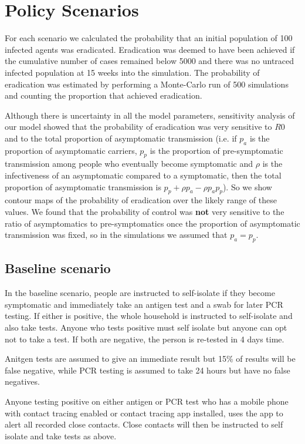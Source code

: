 \documentclass{article}
\begin{document}
\section{Policy Scenarios}

For each scenario we calculated the probability that an initial population of 100 infected agents was eradicated. Eradication was deemed to have been achieved if the cumulative number of cases remained below 5000 and there was no untraced infected population at 15 weeks into the simulation. The probability of eradication was estimated by performing a Monte-Carlo run of 500 simulations and counting the proportion that achieved eradication.

Although there is uncertainty in all the model parameters, sensitivity analysis of our model showed that the probability of eradication was very sensitive to $R0$ and to the total proportion of asymptomatic transmission (i.e. if $p_a$ is the proportion of asymptomatic carriers, $p_p$ is the proportion of pre-symptomatic transmission among people who eventually become symptomatic and $\rho$ is the infectiveness of an asymptomatic compared to a symptomatic, then the total proportion of asymptomatic transmission is $p_p + \rho  p_a - \rho p_ap_p$). So we show contour maps of the probability of eradication over the likely range of these values. We found that the probability of control was \textbf{not} very sensitive to the ratio of asymptomatics to pre-symptomatics once the proportion of asymptomatic transmission was fixed, so in the simulations we assumed that $p_a = p_p$.

\subsection{Baseline scenario}

In the baseline scenario, people are instructed to self-isolate if they become symptomatic and immediately take an antigen test and a swab for later PCR testing. If either is positive, the whole household is instructed to self-isolate and also take tests. Anyone who tests positive must self isolate but anyone can opt not to take a test. If both are negative, the person is re-tested in 4 days time.

Anitgen tests are assumed to give an immediate result but 15\% of results will be false negative, while PCR testing is assumed to take 24 hours but have no false negatives.

Anyone testing positive on either antigen or PCR test who has a mobile phone with contact tracing enabled or contact tracing app installed, uses the app to alert all recorded close contacts. Close contacts will then be instructed to self isolate and take tests as above.
\end{document}
